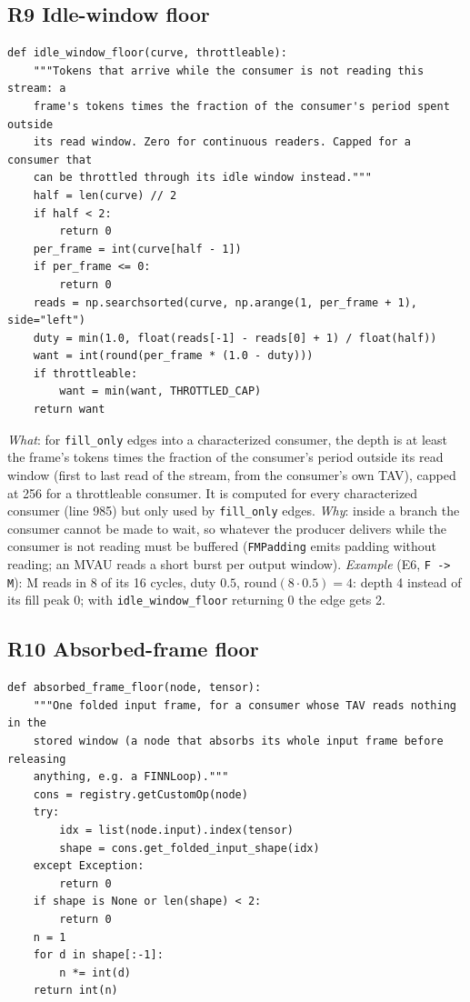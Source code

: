 \documentclass[10pt,a4paper]{article}
\newcommand{\code}[1]{\texttt{#1}}
\begin{document}
\subsection{R9 Idle-window floor}

\begin{lstlisting}[firstnumber=728,title={\texttt{src/finn/transformation/fpgadataflow/derive\_characteristic.py}, lines 728--744}]
def idle_window_floor(curve, throttleable):
    """Tokens that arrive while the consumer is not reading this stream: a
    frame's tokens times the fraction of the consumer's period spent outside
    its read window. Zero for continuous readers. Capped for a consumer that
    can be throttled through its idle window instead."""
    half = len(curve) // 2
    if half < 2:
        return 0
    per_frame = int(curve[half - 1])
    if per_frame <= 0:
        return 0
    reads = np.searchsorted(curve, np.arange(1, per_frame + 1), side="left")
    duty = min(1.0, float(reads[-1] - reads[0] + 1) / float(half))
    want = int(round(per_frame * (1.0 - duty)))
    if throttleable:
        want = min(want, THROTTLED_CAP)
    return want
\end{lstlisting}

\emph{What}: for \code{fill\_only} edges into a characterized consumer, the
depth is at least the frame's tokens times the fraction of the consumer's period
outside its read window (first to last read of the stream, from the consumer's own TAV),
capped at 256 for a throttleable consumer. It is computed for every characterized consumer
(line 985) but only used by \code{fill\_only} edges. \emph{Why}: inside a branch the
consumer cannot be made to wait, so whatever the producer delivers while the
consumer is not reading must be buffered (\code{FMPadding} emits padding without
reading; an MVAU reads a short burst per output window).
\emph{Example} (E6, \code{F -> M}): M reads in 8 of its 16 cycles, duty $0.5$,
$\mathrm{round}(8\cdot0.5)=4$: depth 4 instead of its fill peak 0; with
\code{idle\_window\_floor} returning 0 the edge gets 2.

\subsection{R10 Absorbed-frame floor}

\begin{lstlisting}[firstnumber=747,title={\texttt{src/finn/transformation/fpgadataflow/derive\_characteristic.py}, lines 747--762}]
def absorbed_frame_floor(node, tensor):
    """One folded input frame, for a consumer whose TAV reads nothing in the
    stored window (a node that absorbs its whole input frame before releasing
    anything, e.g. a FINNLoop)."""
    cons = registry.getCustomOp(node)
    try:
        idx = list(node.input).index(tensor)
        shape = cons.get_folded_input_shape(idx)
    except Exception:
        return 0
    if shape is None or len(shape) < 2:
        return 0
    n = 1
    for d in shape[:-1]:
        n *= int(d)
    return int(n)
\end{lstlisting}
\end{document}
